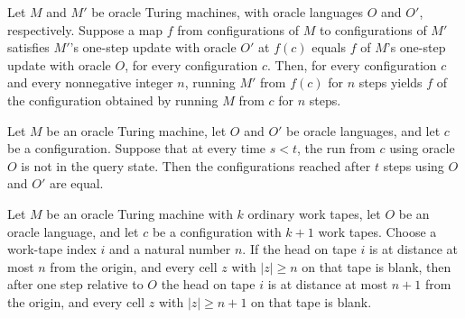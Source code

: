 \begin{theorem}
\label{Turing.OracleTM.runFrom_comm_of_step}
\leanok
{}
Let $M$ and $M'$ be oracle Turing machines, with oracle languages $O$ and $O'$,
respectively. Suppose a map $f$ from configurations of $M$ to configurations of $M'$
satisfies $M'$'s one-step update with oracle $O'$ at $f(c)$ equals $f$ of $M$'s one-step
update with oracle $O$, for every configuration $c$. Then, for every configuration $c$
and every nonnegative integer $n$, running $M'$ from $f(c)$ for $n$ steps yields $f$ of
the configuration obtained by running $M$ from $c$ for $n$ steps.
\end{theorem}

\begin{theorem}
\label{Turing.OracleTM.runFrom_eq_of_forall_ne_qQuery}
\leanok
{}
Let $M$ be an oracle Turing machine, let $O$ and $O'$ be oracle languages, and let $c$
be a configuration. Suppose that at every time $s<t$, the run from $c$ using oracle $O$
is not in the query state. Then the configurations reached after $t$ steps using $O$ and
$O'$ are equal.
\end{theorem}

\begin{theorem}
\label{Turing.OracleTM.step_radius}
\leanok
{}
Let $M$ be an oracle Turing machine with $k$ ordinary work tapes, let $O$ be an oracle
language, and let $c$ be a configuration with $k+1$ work tapes. Choose a work-tape index
$i$ and a natural number $n$. If the head on tape $i$ is at distance at most $n$ from
the origin, and every cell $z$ with $|z|\ge n$ on that tape is blank, then after one
step relative to $O$ the head on tape $i$ is at distance at most $n+1$ from the origin,
and every cell $z$ with $|z|\ge n+1$ on that tape is blank.
\end{theorem}

